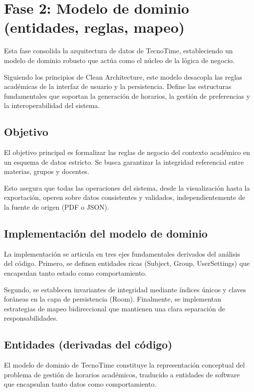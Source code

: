 \section{Fase 2: Modelo de dominio (entidades, reglas, mapeo)}

Esta fase consolida la arquitectura de datos de TecnoTime, estableciendo un modelo de dominio robusto que actúa como el núcleo de la lógica de negocio.
  
Siguiendo los principios de Clean Architecture, este modelo desacopla las reglas académicas de la interfaz de usuario y la persistencia. Define las estructuras fundamentales que soportan la generación de horarios, la gestión de preferencias y la interoperabilidad del sistema.

\subsection{Objetivo}
El objetivo principal es formalizar las reglas de negocio del contexto académico en un esquema de datos estricto. Se busca garantizar la integridad referencial entre materias, grupos y docentes.

Esto asegura que todas las operaciones del sistema, desde la visualización hasta la exportación, operen sobre datos consistentes y validados, independientemente de la fuente de origen (PDF o JSON).

\subsection{Implementación del modelo de dominio}
La implementación se articula en tres ejes fundamentales derivados del análisis del código. Primero, se definen entidades ricas (Subject, Group, UserSettings) que encapsulan tanto estado como comportamiento.

Segundo, se establecen invariantes de integridad mediante índices únicos y claves foráneas en la capa de persistencia (Room). Finalmente, se implementan estrategias de mapeo bidireccional que mantienen una clara separación de responsabilidades.

\subsection{Entidades (derivadas del código)}
El modelo de dominio de TecnoTime constituye la representación conceptual del problema de gestión de horarios académicos, traducido a entidades de software que encapsulan tanto datos como comportamiento.

